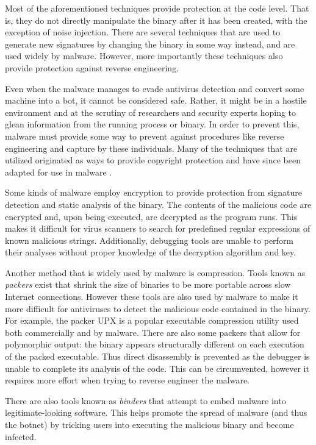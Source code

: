 \documentclass{acm_proc_article-sp}
\begin{document}
Most of the aforementioned techniques provide protection at the code level. That is, they do not directly manipulate the binary after it has been created, with the exception of noise injection. There are several techniques that are used to generate new signatures by changing the binary in some way instead, and are used widely by malware. However, more importantly these techniques also provide protection against reverse engineering.

Even when the malware manages to evade antivirus detection and convert some machine into a bot, it cannot be considered safe. Rather, it might be in a hostile environment and at the scrutiny of researchers and security experts hoping to glean information from the running process or binary. In order to prevent this, malware must provide some way to prevent against procedures like reverse engineering and capture by these individuals. Many of the techniques that are utilized originated as ways to provide copyright protection and have since been adapted for use in malware \cite{ollmann:evasion}.

Some kinds of malware employ encryption to provide protection from signature detection and static analysis of the binary. The contents of the malicious code are encrypted and, upon being executed, are decrypted as the program runs. This makes it difficult for virus scanners to search for predefined regular expressions of known malicious strings. Additionally, debugging tools are unable to perform their analyses without proper knowledge of the decryption algorithm and key.

Another method that is widely used by malware is compression. Tools known as \emph{packers} exist that shrink the size of binaries to be more portable across slow Internet connections. However these tools are also used by malware to make it more difficult for antiviruses to detect the malicious code contained in the binary. For example, the packer UPX is a popular executable compression utility used both commercially and by malware. There are also some packers that allow for polymorphic output: the binary appears structurally different on each execution of the packed executable. Thus direct disassembly is prevented as the debugger is unable to complete its analysis of the code. This can be circumvented, however it requires more effort when trying to reverse engineer the malware.

There are also tools known as \emph{binders} that attempt to embed malware into legitimate-looking software. This helps promote the spread of malware (and thus the botnet) by tricking users into executing the malicious binary and become infected.
\end{document}
